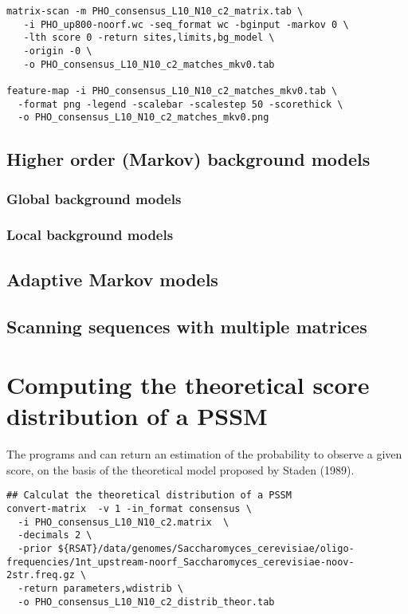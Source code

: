 {\color{Blue} \begin{footnotesize} 
\begin{verbatim}
matrix-scan -m PHO_consensus_L10_N10_c2_matrix.tab \
   -i PHO_up800-noorf.wc -seq_format wc -bginput -markov 0 \
   -lth score 0 -return sites,limits,bg_model \
   -origin -0 \
   -o PHO_consensus_L10_N10_c2_matches_mkv0.tab

feature-map -i PHO_consensus_L10_N10_c2_matches_mkv0.tab \
  -format png -legend -scalebar -scalestep 50 -scorethick \
  -o PHO_consensus_L10_N10_c2_matches_mkv0.png 

\end{verbatim} \end{footnotesize}
}


\subsection{Higher order (Markov) background models}

\subsubsection{Global background models}

\subsubsection{Local background models}

\subsection{Adaptive Markov models}

\subsection{Scanning sequences with multiple matrices}

\section{Computing the theoretical score distribution of a PSSM}

The programs  and  can
return an estimation of the probability to observe a given score, on
the basis of the theoretical model proposed by Staden (1989).

{\color{Blue} \begin{footnotesize} 
\begin{verbatim}
## Calculat the theoretical distribution of a PSSM
convert-matrix  -v 1 -in_format consensus \
  -i PHO_consensus_L10_N10_c2.matrix  \
  -decimals 2 \
  -prior ${RSAT}/data/genomes/Saccharomyces_cerevisiae/oligo-frequencies/1nt_upstream-noorf_Saccharomyces_cerevisiae-noov-2str.freq.gz \
  -return parameters,wdistrib \
  -o PHO_consensus_L10_N10_c2_distrib_theor.tab
\end{verbatim} \end{footnotesize}
}

